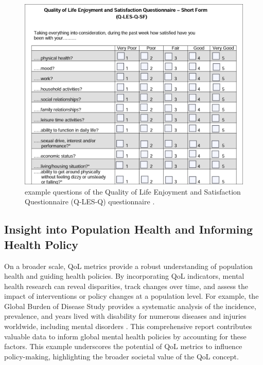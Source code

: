 \documentclass[10pt]{article}
\begin{document}
\begin{sloppypar}
  \begin{figure}[ht]
    \centering
    \includegraphics[width=\textwidth]{figures/q-les.png}
    \caption[Example questions of the Quality of Life Enjoyment and Satisfaction Questionnaire (Q-LES-Q) questionnaire.]{example questions of the Quality of Life Enjoyment and Satisfaction Questionnaire (Q-LES-Q) questionnaire \citep{endicott_quality_1993}.}
    \label{fig:q-les}
  \end{figure}

  \subsection{Insight into Population Health and Informing Health Policy}
  \label{subsec:population-health}
  On a broader scale, QoL metrics provide a robust understanding of population health and guiding health policies. By incorporating QoL indicators, mental health research can reveal disparities, track changes over time, and assess the impact of interventions or policy changes at a population level.
  For example, the Global Burden of Disease Study \citeyearpar{gbd_2017_disease_and_injury_incidence_and_prevalence_collaborators_global_2018} provides a systematic analysis of the incidence, prevalence, and years lived with disability for numerous diseases and injuries worldwide, including mental disorders \citep{gbd_2017_disease_and_injury_incidence_and_prevalence_collaborators_global_2018}. This comprehensive report contributes valuable data to inform global mental health policies by accounting for these factors. This example underscores the potential of QoL metrics to influence policy-making, highlighting the broader societal value of the QoL concept.


\end{sloppypar}
\end{document}

